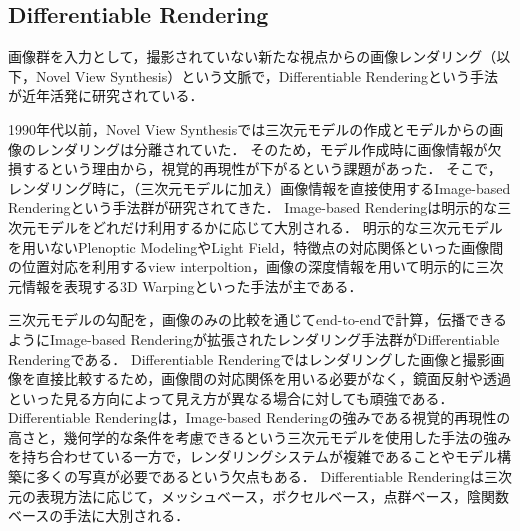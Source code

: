 \subsection{Differentiable Rendering}\label{subsec:Differentiable Rendering}
画像群を入力として，撮影されていない新たな視点からの画像レンダリング（以下，Novel View Synthesis）という文脈で，Differentiable Renderingという手法が近年活発に研究されている．\par

1990年代以前，Novel View Synthesisでは三次元モデルの作成とモデルからの画像のレンダリングは分離されていた．
そのため，モデル作成時に画像情報が欠損するという理由から，視覚的再現性が下がるという課題があった．
そこで，レンダリング時に，（三次元モデルに加え）画像情報を直接使用するImage-based Renderingという手法群が研究されてきた．
Image-based Renderingは明示的な三次元モデルをどれだけ利用するかに応じて大別される\cite{image_based_rendering}．
明示的な三次元モデルを用いないPlenoptic Modeling\cite{pleptonic_modeling}やLight Field\cite{light_field}，特徴点の対応関係といった画像間の位置対応を利用するview interpoltion\cite{view_interpolation}，画像の深度情報を用いて明示的に三次元情報を表現する3D Warping\cite{3d_warping}といった手法が主である．\par

三次元モデルの勾配を，画像のみの比較を通じてend-to-endで計算，伝播できるようにImage-based Renderingが拡張されたレンダリング手法群がDifferentiable Renderingである．
Differentiable Renderingではレンダリングした画像と撮影画像を直接比較するため，画像間の対応関係を用いる必要がなく，鏡面反射や透過といった見る方向によって見え方が異なる場合に対しても頑強である．
Differentiable Renderingは，Image-based Renderingの強みである視覚的再現性の高さと，幾何学的な条件を考慮できるという三次元モデルを使用した手法の強みを持ち合わせている一方で，レンダリングシステムが複雑であることやモデル構築に多くの写真が必要であるという欠点もある\cite{differentiable_rendering}．
Differentiable Renderingは三次元の表現方法に応じて，メッシュベース，ボクセルベース，点群ベース，陰関数ベースの手法に大別される．\par

